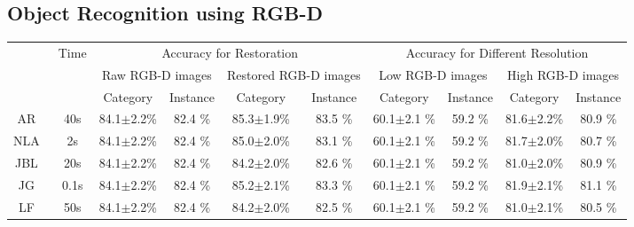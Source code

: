 \documentclass[preprint,10pt,5p,times,twocolumn]{elsarticle}
\begin{document}
\subsection{Object Recognition using RGB-D}


\begin{table}[t]
\centering
\begin{tabular}{|c|c|c|c|c|c|c|c|c|c|}
\hline
\multirow{3}{*}{} & \multicolumn{1}{l|}{\multirow{3}{*}{Time}} & \multicolumn{4}{c|}{ Accuracy for Restoration}                         & \multicolumn{4}{c|}{Accuracy for Different Resolution}                      \\ \cline{3-10}
                  & \multicolumn{1}{l|}{}                      & \multicolumn{2}{c|}{Raw RGB-D images} & \multicolumn{2}{c|}{Restored RGB-D images} & \multicolumn{2}{c|}{Low RGB-D images} & \multicolumn{2}{c|}{High RGB-D images} \\ \cline{3-10}
                  & \multicolumn{1}{l|}{}                      & Category    & Instance   & Category      & Instance      & Category    & Instance   & Category    & Instance    \\ \hline
AR~\cite{YangJingyu2012}                &  40s        &    84.1$\pm$2.2\%    &       82.4 \%           &   85.3$\pm$1.9\%            &     83.5 \%           &   60.1$\pm$2.1 \% &  59.2 \%   &      81.6$\pm$2.2\%    &       80.9 \%          \\ \hline
NLA~\cite{Yang2012}              &     2s           &    84.1$\pm$2.2\%    &       82.4 \%          &  85.0$\pm$2.0\%            &     83.1 \%        &     60.1$\pm$2.1 \% &  59.2 \%          &        81.7$\pm$2.0\%            &     80.7 \%             \\ \hline
JBL~\cite{Kopf2007}               &    20s       &     84.1$\pm$2.2\%    &       82.4 \%         &    84.2$\pm$2.0\%            &     82.6 \%         &      60.1$\pm$2.1 \% &  59.2 \%           &        81.0$\pm$2.0\%            &     80.9 \%         \\ \hline
JG~\cite{Liu2013}                &   0.1s     &        84.1$\pm$2.2\%    &       82.4 \%          &     85.2$\pm$2.1\%    &       83.3 \%         &      60.1$\pm$2.1 \% &  59.2 \%       &        81.9$\pm$2.1\%    &       81.1 \%          \\ \hline
LF~\cite{Kang_ET_2014}                &    50s    &     84.1$\pm$2.2\%    &       82.4 \%       &    84.2$\pm$2.0\%    &       82.5 \%              &       60.1$\pm$2.1 \% &  59.2 \%         &       81.0$\pm$2.1\%    &       80.5 \%                \\ \hline

\end{tabular}
\end{table}
\end{document}
